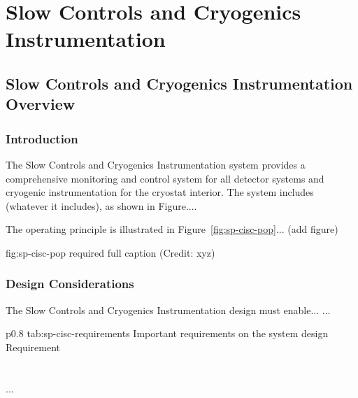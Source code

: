 \chapter{Slow Controls and Cryogenics Instrumentation}
\label{ch:fdsp-slow-cryo}

\section{Slow Controls and Cryogenics Instrumentation Overview}
\label{sec:fdsp-slow-cryo-ov}


\subsection{Introduction}
\label{sec:fdsp-slow-cryo-intro}

The Slow Controls and Cryogenics Instrumentation system provides a
comprehensive monitoring and control system for all detector systems
and cryogenic instrumentation for the cryostat interior.
The system includes (whatever it includes), as shown in Figure.... 


The operating principle is illustrated in Figure~\ref{fig:sp-cisc-pop}... (add figure)

\begin{dunefigure}{fig:sp-cisc-pop}
{required full caption (Credit: xyz)}
\end{dunefigure}

\subsection{Design Considerations}
\label{sec:fdsp-slow-cryo-des-consid}


The Slow Controls and Cryogenics Instrumentation design must enable... 
...


\begin{dunetable}
{p{0.8\textwidth}}
{tab:sp-cisc-requirements}
{Important requirements on the system design}   
Requirement  \\ \toprowrule
  \\ \colhline
   \\ \colhline
 ...\\ 
\end{dunetable}


